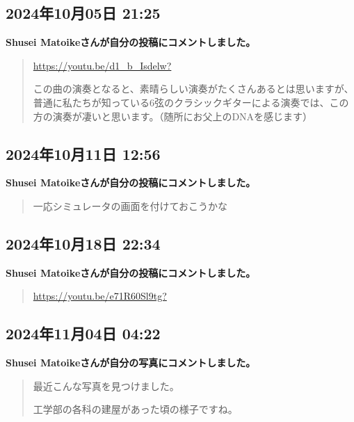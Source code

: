 \subsection*{2024年10月05日 21:25}

\textbf{Shusei Matoikeさんが自分の投稿にコメントしました。}

\begin{quote}
\url{https://youtu.be/d1_b_Isdelw?}

この曲の演奏となると、素晴らしい演奏がたくさんあるとは思いますが、普通に私たちが知っている6弦のクラシックギターによる演奏では、この方の演奏が凄いと思います。（随所にお父上のDNAを感じます）
\end{quote}

\subsection*{2024年10月11日 12:56}

\textbf{Shusei Matoikeさんが自分の投稿にコメントしました。}

\begin{quote}
一応シミュレータの画面を付けておこうかな
\end{quote}

\subsection*{2024年10月18日 22:34}

\textbf{Shusei Matoikeさんが自分の投稿にコメントしました。}

\begin{quote}
\url{https://youtu.be/e71R60Sl9tg?}
\end{quote}

\subsection*{2024年11月04日 04:22}

\textbf{Shusei Matoikeさんが自分の写真にコメントしました。}

\begin{quote}
最近こんな写真を見つけました。

工学部の各科の建屋があった頃の様子ですね。
\end{quote}

